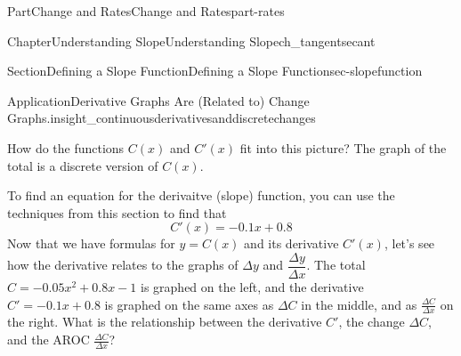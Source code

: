 \documentclass[oneside,10pt,]{tufte-book}
\numberwithin{equation}{chapter}
\def \tikzhistogram (#1,#2){\draw[fill=blue,opacity=0.3] ({#1+((\xtwo-\xmin)/5)},#2) rectangle ({#1-((\xtwo-\xmin)/5)},0); \draw[draw,thick] ({#1+((\xtwo-\xmin)/5)},#2) rectangle ({#1-((\xtwo-\xmin)/5)},0); \node[draw,fill=blue, circle,inner sep=2.5pt] at (#1,#2) {};}
\begin{document}
\begin{partptx}{Part}{Change and Rates}{}{Change and Rates}{}{}{part-rates}
\begin{chapterptx}{Chapter}{Understanding Slope}{}{Understanding Slope}{}{}{ch_tangentsecant}
\begin{sectionptx}{Section}{Defining a Slope Function}{}{Defining a Slope Function}{}{}{sec-slopefunction}
\begin{insight}{Application}{Derivative Graphs Are (Related to) Change Graphs.}{insight_continuousderivativesanddiscretechanges}
\begin{image}{0}{1}{0}{}
{
}%
\end{image}%
How do the functions \(C(x)\) and \(C'(x)\) fit into this picture? The graph of the total is a discrete version of \(C(x)\).%
\par
To find an equation for the derivaitve (slope) function, you can use the techniques from this section to find that%
\begin{equation*}
C'(x) = -0.1 x + 0.8
\end{equation*}
Now that we have formulas for \(y=C(x)\) and its derivative \(C'(x)\), let's see how the derivative relates to the graphs of \(\Delta y\) and \(\dfrac{\Delta y}{\Delta x}\). The total \(C = -0.05 x^2 + 0.8 x - 1\) is graphed on the left, and the derivative \(C' = -0.1 x + 0.8\) is graphed on the same axes as \(\Delta C\) in the middle, and as \(\frac{\Delta C}{\Delta x}\) on the right. What is the relationship between the derivative \(C'\), the change \(\Delta C\), and the AROC \(\frac{\Delta C}{\Delta x}\)?%
\begin{image}{0}{1}{0}{}%
\end{image}
\end{insight}
\end{sectionptx}
\end{chapterptx}
\end{partptx}
\end{document}

